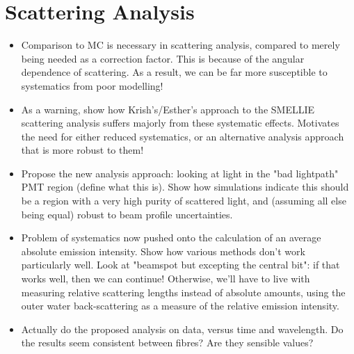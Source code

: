{\section{Scattering Analysis}
\begin{itemize}
    \item Comparison to MC is necessary in scattering analysis, compared to merely being needed as a correction factor. This is because of the angular dependence of scattering. As a result, we can be far more susceptible to systematics from poor modelling!
    \item As a warning, show how Krish's/Esther's approach to the SMELLIE scattering analysis suffers majorly from these systematic effects. Motivates the need for either reduced systematics, or an alternative analysis approach that is more robust to them!
    \item Propose the new analysis approach: looking at light in the "bad lightpath" PMT region (define what this is). Show how simulations indicate this should be a region with a very high purity of scattered light, and (assuming all else being equal) robust to beam profile uncertainties.
    \item Problem of systematics now pushed onto the calculation of an average absolute emission intensity. Show how various methods don't work particularly well. Look at "beamspot but excepting the central bit": if that works well, then we can continue! Otherwise, we'll have to live with measuring relative scattering lengths instead of absolute amounts, using the outer water back-scattering as a measure of the relative emission intensity.
    \item Actually do the proposed analysis on data, versus time and wavelength. Do the results seem consistent between fibres? Are they sensible values?
\end{itemize}

}